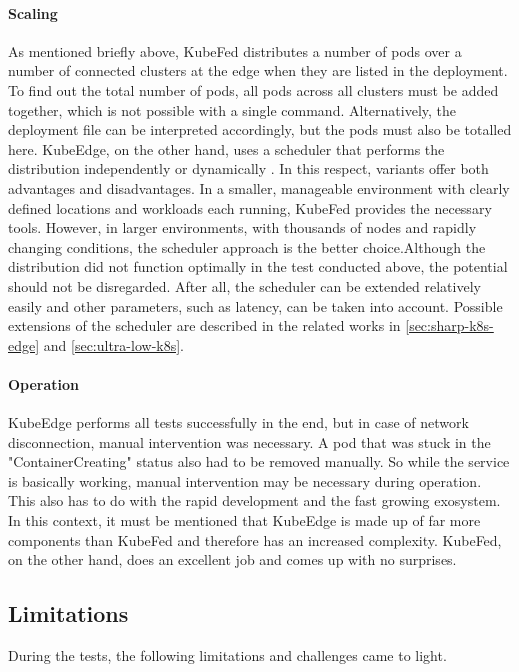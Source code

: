 \documentclass[MIC,Master,english]{twbook}%
\begin{document}
\paragraph{Scaling} As mentioned briefly above, KubeFed distributes a number of pods over a number of connected clusters at the edge when they are listed in the deployment. To find out the total number of pods, all pods across all clusters must be added together, which is not possible with a single command. Alternatively, the deployment file can be interpreted accordingly, but the pods must also be totalled here. KubeEdge, on the other hand, uses a scheduler that performs the distribution independently or dynamically \cite{ke-doc-schedule}. In this respect, variants offer both advantages and disadvantages. In a smaller, manageable environment with clearly defined locations and workloads each running, KubeFed provides the necessary tools. However, in larger environments, with thousands of nodes and rapidly changing conditions, the scheduler approach is the better choice.Although the distribution did not function optimally in the test conducted above, the potential should not be disregarded. After all, the scheduler can be extended relatively easily and other parameters, such as latency, can be taken into account. Possible extensions of the scheduler are described in the related works in \autoref{sec:sharp-k8s-edge} and \autoref{sec:ultra-low-k8s}.

\paragraph{Operation} KubeEdge performs all tests successfully in the end, but in case of network disconnection, manual intervention was necessary. A pod that was stuck in the "ContainerCreating" status also had to be removed manually. So while the service is basically working, manual intervention may be necessary during operation. This also has to do with the rapid development and the fast growing exosystem. In this context, it must be mentioned that KubeEdge is made up of far more components than KubeFed and therefore has an increased complexity. KubeFed, on the other hand, does an excellent job and comes up with no surprises.

\subsection{Limitations}
During the tests, the following limitations and challenges came to light.
\end{document}
